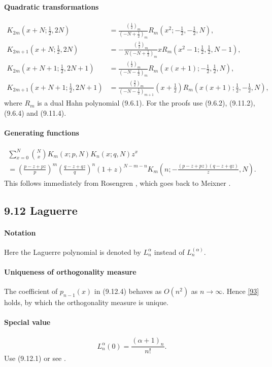 \documentclass[twoside,11pt]{article}
\newcommand\al\alpha
\newcommand\thalf{\tfrac12}
\newcommand\iy\infty
\begin{document}
\paragraph{Quadratic transformations}
\begin{align}
K_{2m}(x+N;\thalf,2N)&=\frac{(\thalf)_m}{(-N+\thalf)_m} 
R_m(x^2;-\thalf,-\thalf,N),
\label{31}\\
K_{2m+1}(x+N;\thalf,2N)&=- \frac{(\tfrac32)_m}{N (-N+\thalf)_m} 
x R_m(x^2-1;\thalf,\thalf,N-1),
\label{33}\\
K_{2m}(x+N+1;\thalf,2N+1)&=\frac{(\tfrac12)_m}{(-N-\thalf)_m} 
R_m(x(x+1);-\thalf,\thalf,N),
\label{32}\\
K_{2m+1}(x+N+1;\thalf,2N+1)&=\frac{(\tfrac32)_m}{(-N-\thalf)_{m+1}} 
(x+\thalf) R_m(x(x+1);\thalf,-\thalf,N),
\label{34}
\end{align}
where $R_m$ is a dual Hahn polynomial (9.6.1). For the proofs use
(9.6.2), (9.11.2), (9.6.4) and (9.11.4).
%
\paragraph{Generating functions}
\begin{multline}
\sum_{x=0}^N\binom Nx K_m(x;p,N)K_n(x;q,N)z^x\\
=\left(\frac{p-z+pz}p\right)^m
\left(\frac{q-z+qz}q\right)^n
(1+z)^{N-m-n}
K_m\left(n;- \frac{(p-z+pz)(q-z+qz)}z,N\right).
\label{107}
\end{multline}
This follows immediately from Rosengren \cite[(3.5)]{K8}, which goes back
to Meixner \cite{K9}.
%
\subsection*{9.12 Laguerre}
\label{sec9.12}
\paragraph{Notation}
Here the Laguerre polynomial is denoted by $L_n^\al$ instead of
$L_n^{(\al)}$.
%
\paragraph{Uniqueness of orthogonality measure}
The coefficient of $p_{n-1}(x)$ in (9.12.4) behaves as $O(n^2)$ as $n\to\iy$.
Hence \eqref{93} holds, by which the orthogonality measure is unique.
%
\paragraph{Special value}
\begin{equation}
L_n^{\al}(0)=\frac{(\al+1)_n}{n!} .
\label{53}
\end{equation}
Use (9.12.1) or see .
%
\end{document}

